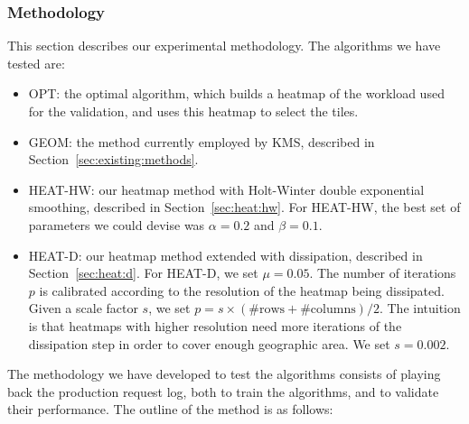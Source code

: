 \documentclass[11pt, oneside]{report}
\begin{document}
{\subsubsection{Methodology}
\label{sec:methods}

This section describes our experimental methodology. The algorithms we have tested are:

\begin{itemize}

\item OPT: the optimal algorithm, which builds a heatmap of the workload used for the validation, and uses this heatmap to select the tiles. 

\item GEOM: the method currently employed by KMS, described in Section~\ref{sec:existing:methods}.

\item HEAT-HW: our heatmap method with Holt-Winter double exponential smoothing, described in Section~\ref{sec:heat:hw}. For HEAT-HW, the best set of parameters we could devise was $\alpha = 0.2$ and $\beta = 0.1$. 

\item HEAT-D: our heatmap method extended with dissipation, described in Section~\ref{sec:heat:d}. For HEAT-D, we set $\mu = 0.05$. The number of iterations $p$ is calibrated according to the resolution of the heatmap being dissipated. Given a scale factor $s$, we set $p = s \times (\text{\#rows}+\text{\#columns})/2$. The intuition is that heatmaps with higher resolution need more iterations of the dissipation step in order to cover enough geographic area. We set $s = 0.002$. 

\end{itemize}

The methodology we have developed to test the algorithms consists of playing back the production request log, both to train the algorithms, and to validate their performance. The outline of the method is as follows:

}
\end{document}
